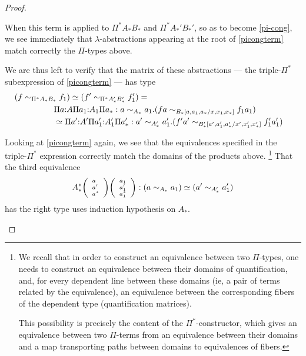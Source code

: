 \documentclass[10pt]{article}
\newcommand{\eeq}{\simeq}
\newcommand{\tripar}[3]{
{\scriptsize \left(
  \begin{array}{l}
    {#1}\\
    {#2}\\
    {#3}
  \end{array}
\right)}}
\begin{document}
\begin{proof}
\begin{description}
When this term is applied to ${\Pi^* A_* B_*}$
and ${\Pi^* A_*' B_*'}$, so as to become \eqref{pi-cong},
we see immediately that $\lambda$-abstractions appearing at the root of
\eqref{picongterm} match correctly the $\Pi$-types above.

We are thus left to verify that the matrix of these abstractions 
 ---  the triple-$\Pi^*$ subexpression of \eqref{picongterm} ---  has type
\begin{align}
(f \sim_{\Pi^* A_* B_*} f_1) \eeq (f' \sim_{\Pi^* A_*' B_*'} f'_1) =
\hspace{-4cm}
\label{toprovepicong}\\
& \Pi a{:}A \Pi a_1{:}A_1 \Pi a_* : a \sim_{A_*} a_1. (f a
\sim_{B_*[a,a_1,a_*/x,x_1,x_*]} f_1 a_1)\notag\\
&   \eeq  \Pi a'{:}A' \Pi a'_1{:}A'_1 \Pi a'_* : a' \sim_{A'_*} a'_1. (f' a'
\sim_{B'_*[a',a'_1,a'_*/x',x'_1,x'_*]} f'_1 a'_1)\notag
\end{align}

Looking at \eqref{picongterm} again, we see that the
equivalences specified in the triple-$\Pi^*$ expression
correctly match the domains of the products above.
\footnote{
We recall that in order to construct an equivalence between two $\Pi$-types, one
needs to construct an equivalence between their domains of
quantification,
and, for every dependent line between these domains (ie, a
pair of terms related by the equivalence), an equivalence between
the corresponding fibers of the dependent type (quantification
matrices).

This possibility is precisely the content of the $\Pi^*$-constructor, which
gives an equivalence between two $\Pi$-terms from an equivalence between their
domains and a map transporting paths between domains to equivalences
of fibers.}
That the third equivalence
\[A^*_* \tripar{a} {a'} {a^*} \tripar{a_1} {a_1'} {a_1^*} : (a \sim_{A_*} a_1) \eeq (a'
\sim_{A'_*} a'_1) \]
has the right type uses induction hypothesis on $A_*$.


\end{description}
\end{proof}
\end{document}
